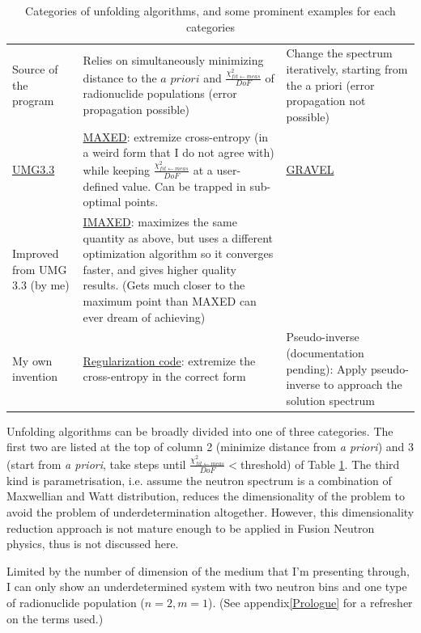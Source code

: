 \documentclass[a4paper, 12pt]{article}
\newcommand{\apriori}{\textit{a priori}}
\newcommand{\chifit}{\frac{\chi^2_{fit\leftarrow meas}}{DoF} }
\begin{document}
\begin{table}[H]
\begin{tabularx}{\textwidth}{|X|X|X|}
\hline
Source of the program & Relies on simultaneously minimizing distance to the $\apriori$ and $\chifit$ of radionuclide populations (error propagation possible) & Change the spectrum iteratively, starting from the a priori (error propagation not possible)\\
\Xhline{2\arrayrulewidth}
\href{https://www.oecd-nea.org/tools/abstract/detail/nea-1665}{UMG3.3}& \href{https://doi.org/10.1097/00004032-199911000-00012}{MAXED}: extremize cross-entropy (in a weird form that I do not agree with) while keeping $\chifit$ at a user-defined value. Can be trapped in sub-optimal points. & \href{http://matzke-bs.de/heprow/Dateien/HEPROW.PDF}{GRAVEL}\\
\hline
Improved from UMG 3.3 (by me)& \href{https://ukaeauk-my.sharepoint.com/:b:/g/personal/chantal_nobs_ukaea_uk/EbLCFG4TD_NJkPLoaduueGgBtVJqSfxOZLLn5zvsWGRkCA?e=31ufjm}{IMAXED}: maximizes the same quantity as above, but uses a different optimization algorithm so it converges faster, and gives higher quality results. (Gets much closer to the maximum point than MAXED can ever dream of achieving)
 & \\
\hline
My own invention& \href{https://ukaeauk-my.sharepoint.com/:b:/g/personal/chantal_nobs_ukaea_uk/Ee3pm8efH11BvZsbbeR7umkBfwP77h5v8KbnyaWB1JeSgw}{Regularization code}: extremize the cross-entropy in the correct form& Pseudo-inverse (documentation pending): Apply pseudo-inverse to approach the solution spectrum\\
\hline
\end{tabularx}
\caption{Categories of unfolding algorithms, and some prominent examples for each categories}\label{Unfolding algorithms category table}
\end{table}
Unfolding algorithms can be broadly divided into one of three categories. The first two are listed at the top of column 2 (minimize distance from \apriori) and 3 (start from \apriori, take steps until $\chifit<$threshold) of Table \ref{Unfolding algorithms category table}. The third kind is parametrisation, i.e. assume the neutron spectrum is a combination of Maxwellian and Watt distribution, reduces the dimensionality of the problem to avoid the problem of underdetermination altogether. However, this dimensionality reduction approach is not mature enough to be applied in Fusion Neutron physics, thus is not discussed here.

Limited by the number of dimension of the medium that I'm presenting through, I can only show an underdetermined system with two neutron bins and one type of radionuclide population ($n=2, m=1$). (See appendix\ref{Prologue} for a refresher on the terms used.)
\end{document}
